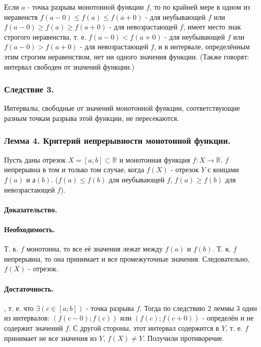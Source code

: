 Если $a$ - точка разрыва монотонной функции $f$, то по крайней мере в одном из неравенств $f(a-0)\leq f(a)\leq f(a+0)$ - для неубывающей $f$ или $f(a-0)\geq f(a)\geq f(a+0)$ - для невозрастающей $f$, имеет место знак строгого неравенства, т. е. $f(a-0) < f(a+0)$ - для неубывающей $f$ или $f(a-0) > f(a+0)$ - для невозрастающей $f$, и в интервале, определённым этим строгим неравенством, нет ни одного значения функции.
(Также говорят: интервал свободен от значений функции.)

\subsubsection{Следствие 3.}

Интервалы, свободные от значений монотонной функции, соответствующие разным точкам разрыва этой функции, не пересекаются.

\subsubsection{Лемма 4. Критерий непрерывности монотонной функции.}

Пусть даны отрезок $X=[a;b] \subset \mathbb{R}$ и монотонная функция $f:X \to \mathbb{R}$.
$f$ непрерывна в том и только том случае, когда $f(X)$ - отрезок $Y$ с концами $f(a)$ и $а(b)$.
($f(a) \leq f(b)$ для неубывающей $f$, $f(a) \geq f(b)$ для невозрастающей $f$).

\paragraph{Доказательство.}

\paragraph{Необходимость.}

Т. к. $f$ монотонна, то все её значения лежат между $f(a)$ и $f(b)$. Т. к. $f$ непрерывна, то она принимает и все промежуточные значения. Следовательно, $f(X)$ - отрезок.

\paragraph{Достаточность.}

\pp, т. е. что $\exists \left(c \in [a;b]\right)$ - точка разрыва $f$.
Тогда по следствию 2 леммы 3 один из интервалов: $\left(f(c-0);f(c)\right)$ или $\left(f(c);f(c+0)\right)$ - определён и не содержит значений $f$.
С другой стороны, этот интервал содержится в $Y$, т. е. $f$ принимает не все значения из $Y$, $f(X)\neq Y$. Получили противоречие.











